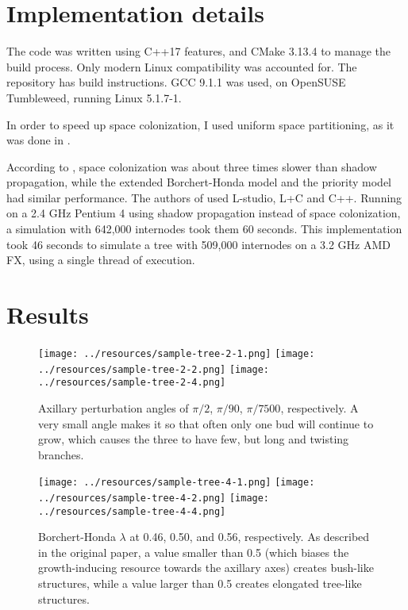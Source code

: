 \documentclass{article}
\begin{document}
\section{Implementation details}

The code was written using C++17 features, and CMake 3.13.4 to manage the build process.
Only modern Linux compatibility was accounted for.
The repository has build instructions.
GCC 9.1.1 was used, on OpenSUSE Tumbleweed, running Linux 5.1.7-1.

In order to speed up space colonization, I used uniform space partitioning, as it was done in \cite{Palubicki2009}.

According to \cite{Palubicki2009}, space colonization was about three times slower than shadow propagation, while the extended Borchert-Honda model and the priority model had similar performance.
The authors of \cite{Palubicki2009} used L-studio, L+C and C++. Running on a 2.4 GHz Pentium 4 using shadow propagation instead of space colonization, a simulation with 642,000 internodes took them 60 seconds.
This implementation took 46 seconds to simulate a tree with 509,000 internodes on a 3.2 GHz AMD FX, using a single thread of execution.

\section{Results}

\begin{figure}[H]
\centering
\texttt{[image: ../resources/sample-tree-2-1.png]}
\texttt{[image: ../resources/sample-tree-2-2.png]}
\texttt{[image: ../resources/sample-tree-2-4.png]}
\caption{Axillary perturbation angles of \(\pi / 2\), \(\pi / 90\), \(\pi / 7500\), respectively. A very small angle makes it so that often only one bud will continue to grow, which causes the three to have few, but long and twisting branches.}
\end{figure}

\begin{figure}[H]
\centering
\texttt{[image: ../resources/sample-tree-4-1.png]}
\texttt{[image: ../resources/sample-tree-4-2.png]}
\texttt{[image: ../resources/sample-tree-4-4.png]}
\caption{Borchert-Honda \(\lambda\) at 0.46, 0.50, and 0.56, respectively. As described in the original paper, a value smaller than 0.5 (which biases the growth-inducing resource towards the axillary axes) creates bush-like structures, while a value larger than 0.5 creates elongated tree-like structures.}
\end{figure}
\end{document}
